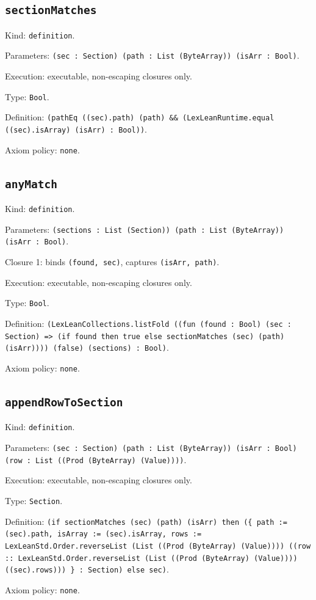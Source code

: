 \documentclass[11pt]{article}
\begin{document}
\subsection*{\texttt{sectionMatches}}
\noindent Kind: \texttt{definition}.\par
\noindent Parameters: \texttt{(sec : Section) (path : List (ByteArray)) (isArr : Bool)}.\par
\noindent Execution: executable, non-escaping closures only.\par
\noindent Type: \texttt{Bool}.\par
\noindent Definition: \texttt{(pathEq ((sec).path) (path) \&\& (LexLeanRuntime.equal ((sec).isArray) (isArr) : Bool))}.\par
\noindent Axiom policy: \texttt{none}.\par
\subsection*{\texttt{anyMatch}}
\noindent Kind: \texttt{definition}.\par
\noindent Parameters: \texttt{(sections : List (Section)) (path : List (ByteArray)) (isArr : Bool)}.\par
\noindent Closure 1: binds \texttt{(found, sec)}, captures \texttt{(isArr, path)}.\par
\noindent Execution: executable, non-escaping closures only.\par
\noindent Type: \texttt{Bool}.\par
\noindent Definition: \texttt{(LexLeanCollections.listFold ((fun (found : Bool) (sec : Section) => (if found then true else sectionMatches (sec) (path) (isArr)))) (false) (sections) : Bool)}.\par
\noindent Axiom policy: \texttt{none}.\par
\subsection*{\texttt{appendRowToSection}}
\noindent Kind: \texttt{definition}.\par
\noindent Parameters: \texttt{(sec : Section) (path : List (ByteArray)) (isArr : Bool) (row : List ((Prod (ByteArray) (Value))))}.\par
\noindent Execution: executable, non-escaping closures only.\par
\noindent Type: \texttt{Section}.\par
\noindent Definition: \texttt{(if sectionMatches (sec) (path) (isArr) then (\{ path := (sec).path, isArray := (sec).isArray, rows := LexLeanStd.Order.reverseList (List ((Prod (ByteArray) (Value)))) ((row :: LexLeanStd.Order.reverseList (List ((Prod (ByteArray) (Value)))) ((sec).rows))) \} : Section) else sec)}.\par
\noindent Axiom policy: \texttt{none}.\par
\end{document}
